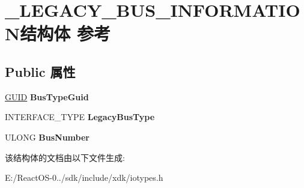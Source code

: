\hypertarget{struct___l_e_g_a_c_y___b_u_s___i_n_f_o_r_m_a_t_i_o_n}{}\section{\+\_\+\+L\+E\+G\+A\+C\+Y\+\_\+\+B\+U\+S\+\_\+\+I\+N\+F\+O\+R\+M\+A\+T\+I\+O\+N结构体 参考}
\label{struct___l_e_g_a_c_y___b_u_s___i_n_f_o_r_m_a_t_i_o_n}
\subsection*{Public 属性}
\begin{DoxyCompactItemize}
\item 
\mbox{\label{struct___l_e_g_a_c_y___b_u_s___i_n_f_o_r_m_a_t_i_o_n_a49c6b6bd79890b1658be6774c967118e}} 
\hyperlink{interface_g_u_i_d}{G\+U\+ID} {\bfseries Bus\+Type\+Guid}
\item 
\mbox{\label{struct___l_e_g_a_c_y___b_u_s___i_n_f_o_r_m_a_t_i_o_n_a28d2d0cfa94ff0baf1933cb0db77a6ac}} 
I\+N\+T\+E\+R\+F\+A\+C\+E\+\_\+\+T\+Y\+PE {\bfseries Legacy\+Bus\+Type}
\item 
\mbox{\label{struct___l_e_g_a_c_y___b_u_s___i_n_f_o_r_m_a_t_i_o_n_a5aad37b2f9f0efed378d354bf29a12b1}} 
U\+L\+O\+NG {\bfseries Bus\+Number}
\end{DoxyCompactItemize}


该结构体的文档由以下文件生成\+:\begin{DoxyCompactItemize}
\item 
E\+:/\+React\+O\+S-\/0../sdk/include/xdk/iotypes.\+h\end{DoxyCompactItemize}
